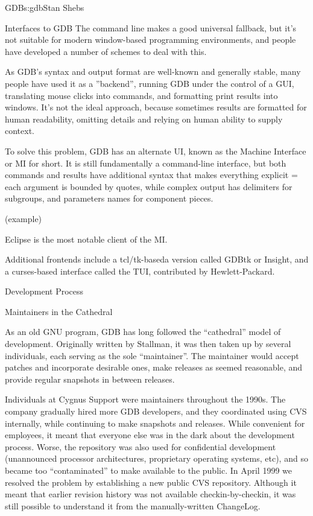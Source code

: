 \begin{aosachapter}{GDB}{s:gdb}{Stan Shebs}
\begin{aosasect1}{Interfaces to GDB}
The command line makes a good universal fallback, but it's not suitable
for modern window-based programming environments, and people have developed
a number of schemes to deal with this.

As GDB's syntax and output format are well-known and generally stable,
many people have used it as a ''backend'', running GDB under the
control of a GUI, translating mouse clicks into commands, and
formatting print results into windows.  It's not the ideal approach,
because sometimes results are formatted for human readability, omitting
details and relying on human ability to supply context.

To solve this problem, GDB has an alternate UI, known as the Machine
Interface or MI for short.  It is still fundamentally a command-line
interface, but both commands and results have additional syntax that
makes everything explicit = each argument is bounded by quotes, while
complex output has delimiters for subgroups, and parameters names for
component pieces.

(example)

Eclipse is the most notable client of the MI.

Additional frontends include a tcl/tk-baseda version called GDBtk or
Insight, and a curses-based interface called the TUI, contributed by
Hewlett-Packard.

\end{aosasect1}

\begin{aosasect1}{Development Process}

\end{aosasect1}

\begin{aosasect1}{Maintainers in the Cathedral}

As an old GNU program, GDB has long followed the ``cathedral'' model of
development.  Originally written by Stallman, it was then taken up by several
individuals, each serving as the sole ``maintainer''.  The maintainer would
accept patches and incorporate desirable ones, make releases as seemed reasonable,
and provide regular snapshots in between releases.

Individuals at Cygnus Support were maintainers throughout the 1990s.
The company gradually hired more GDB developers, and they coordinated
using CVS internally, while continuing to make snapshots and releases.
While convenient for employees, it meant that everyone else was in the
dark about the development process.  Worse, the repository was also
used for confidential development (unannounced processor
architectures, proprietary operating systems, etc), and so became too
``contaminated'' to make available to the public.  In April 1999 we
resolved the problem by establishing a new public CVS repository.
Although it meant that earlier revision history was not available
checkin-by-checkin, it was still possible to understand it from the
manually-written ChangeLog.


\end{aosasect1}
\end{aosachapter}
